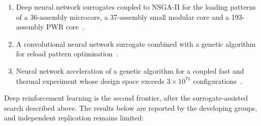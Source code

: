 \begin{enumerate}
  \item Deep neural network surrogates coupled to NSGA-II for the loading
        patterns of a 36-assembly microcore, a 37-assembly small modular
        core and a 193-assembly PWR core~\cite{whyte_2020}.

  \item A convolutional neural network surrogate combined with a
        genetic algorithm for reload pattern
        optimisation~\cite{wan_2022}.

  \item Neural network acceleration of a genetic algorithm for a
        coupled fast and thermal experiment whose design space exceeds
        $3\times10^{71}$ configurations~\cite{pevey_2022}.
\end{enumerate}

Deep reinforcement learning is the second frontier, after the
surrogate-assisted search described above. The results below are
reported by the developing groups, and independent replication remains
limited:

